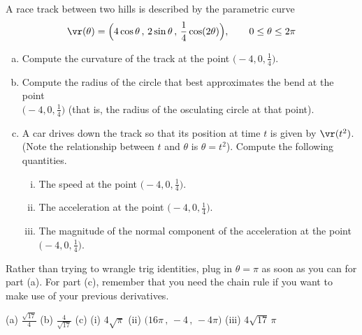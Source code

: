 \begin{question}[M317 2017A] %
	A race track between two hills is described by the parametric curve
	\begin{equation*}
	\vr(\theta) = \Big(4 \cos\theta\,,\, 2\sin\theta\,,\, 
	\frac{1}{4}\cos(2\theta)\Big),\qquad
	0 \le \theta \le 2\pi
	\end{equation*}
	\begin{enumerate}[(a)]
		\item
		Compute the curvature of the track at the point $\big(-4, 0, \frac{1}{4}\big)$.
		
		\item
		Compute the radius of the circle that best approximates the bend at the
		point\\ $\big(-4, 0, \frac{1}{4}\big)$ (that is, the radius of the 
		osculating circle at that point).
		
		\item
		A car drives down the track so that its position at time $t$ is given by
		$\vr(t^2)$. (Note the relationship between $t$ and $\theta$ is $\theta = t^2$). 
		Compute the following quantities.
		\begin{enumerate}[(i)]
			\item
			The speed at the point $\big(-4, 0, \frac{1}{4}\big)$.
			\item
			The acceleration at the point $\big(-4, 0, \frac{1}{4}\big)$.
			
			\item
			The magnitude of the normal component of the acceleration at the point\\
			$\big(-4, 0, \frac{1}{4}\big)$.
		\end{enumerate}
	\end{enumerate}
\end{question}

\begin{hint} 
	Rather than trying to wrangle trig identities, plug in $\theta=\pi$ as soon as you can for part (a). For part (c), remember that you need the chain rule if you want to make use of your previous derivatives.
\end{hint}

\begin{answer} 
	(a) $\frac{\sqrt{17}}{4}$\qquad
	(b) $\frac{4}{\sqrt{17}}$\qquad
	(c) (i) $4\sqrt{\pi} $\quad
	(ii) $\big( 16\pi\,,\, -4\,,\, -4\pi\big)$\quad
	(iii) $4\sqrt{17}\,\pi$
\end{answer}

